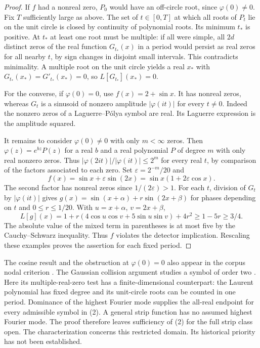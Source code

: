 \documentclass[11pt]{article}
\begin{document}
\begin{proof}
If $f$ had a nonreal zero, $P_0$ would have an off-circle root,
since $\varphi(0)\ne0$. Fix $T$ sufficiently large as above.
The set of $t\in[0,T]$ at which all roots of $P_t$ lie on the unit
circle is closed by continuity of polynomial roots. Its minimum
$t_*$ is positive. At $t_*$ at least one root must be multiple:
if all were simple, all $2d$ distinct zeros of the real function
$G_{t_*}(x)$ in a period would persist as real zeros for all nearby
$t$, by sign changes in disjoint small intervals. This contradicts
minimality. A multiple root on the unit circle yields a real $x_*$
with $G_{t_*}(x_*)=G'_{t_*}(x_*)=0$, so $L[G_{t_*}](x_*)=0$.

For the converse, if $\varphi(0)=0$, use $f(x)=2+\sin x$.
It has nonreal zeros, whereas $G_t$ is a sinusoid of nonzero
amplitude $|\varphi(it)|$ for every $t\ne0$. Indeed the nonzero
zeros of a Laguerre--P\'olya symbol are real. Its Laguerre expression
is the amplitude squared.

It remains to consider $\varphi(0)\ne0$ with only $m<\infty$ zeros.
Then $\varphi(z)=e^{bz}P(z)$ for a real $b$ and a real polynomial
$P$ of degree $m$ with only real nonzero zeros. Thus
$|\varphi(2it)|/|\varphi(it)|\le2^m$ for every real $t$, by
comparison of the factors associated to each zero. Set
$\varepsilon=2^{-m}/20$ and
\[
 f(x)=\sin x+\varepsilon\sin(2x)
     =\sin x(1+2\varepsilon\cos x).
\]
The second factor has nonreal zeros since $1/(2\varepsilon)>1$.
For each $t$, division of $G_t$ by $|\varphi(it)|$ gives
$g(x)=\sin(x+\alpha)+r\sin(2x+\beta)$ for phases depending on
$t$ and $0\le r\le 1/20$. With $u=x+\alpha$, $v=2x+\beta$,
\[
 L[g](x)=1+r(4\cos u\cos v+5\sin u\sin v)+4r^2
       \ge 1-5r\ge 3/4.
\]
The absolute value of the mixed term in parentheses is at most five
by the Cauchy--Schwarz inequality. Thus $f$ violates the detector
implication. Rescaling these examples proves the assertion for
each fixed period.
\end{proof}

The cosine result and the obstruction at $\varphi(0)=0$ also appear
in the corpus nodal criterion \cite{vm103}. The Gaussian collision
argument studies a symbol of order two \cite{vm126}. Here its
multiple-real-zero test has a finite-dimensional counterpart: the
Laurent polynomial has fixed degree and its unit-circle roots can be
counted in one period. Dominance of the highest Fourier mode supplies
the all-real endpoint for every admissible symbol in (2). A general
strip function has no assumed highest Fourier mode. The proof
therefore leaves sufficiency of (2) for the full strip class open.
The characterization concerns this restricted domain. Its historical
priority has not been established.
\end{document}
